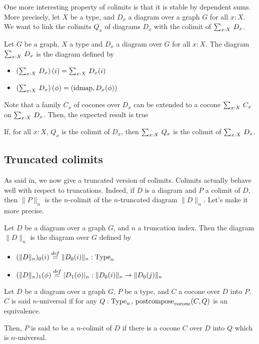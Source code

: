 One more interesting property of colimits is that it is stable by
dependent sums. More precisely, let $X$ be a type, and $D_x$ a diagram
over a graph $G$ for all $x:X$. We want to link the colimits $Q_x$ of
diagrams $D_x$ with the colimit of $\sum_{x:X}\, D_x$.
\begin{defi}
  Let $G$ be a graph, $X$ a type and $D_x$ a diagram over $G$ for all
  $x:X$. The diagram $\sum_{x:X}\, D_x$ is the diagram defined by
  \begin{itemize}
  \item $\left( \sum_{x:X}\, D_x \right)(i) = \sum_{x:X}\, D_x(i)$
  \item $\left( \sum_{x:X}\, D_x \right)(\phi) = (\operatorname{\mathrm{idmap}}, D_x(\phi))$
  \end{itemize}
\end{defi}

Note that a family $C_x$ of cocones over $D_x$ can be extended to a
cocone $\sum_{x:X}\, C_x$ on $\sum_{x:X}\, D_x$. Then, the expected
result is true
\begin{prop}
  If, for all $x:X$, $Q_x$ is the colimit of $D_x$, then $\sum_{x:X}\, Q_x$ is the colimit of $\sum_{x:X}\, D_x$.
\end{prop}




\subsection{Truncated colimits}
\label{ssec:trunc_colim}

As said in, we now give a
truncated version of colimits. 
Colimits actually behave well with respect to truncations. Indeed, if $D$ is a
diagram and $P$ a colimit of $D$, then $\|P\|_n$ is the $n$-colimit
of the $n$-truncated diagram $\|D\|_n$. Let's make it more precise.

\begin{defi}
  Let $D$ be a diagram over a graph $G$, and $n$ a truncation index.
  Then the diagram $\|D\|_n$ is the diagram over $G$ defined by
  \begin{itemize}
  \item $(\|D\|_n)_0(i) \overset{de\hspace{-0.2ex}f}{=} \|D_0(i)\|_n:\operatorname{Type}_n$
  \item $(\|D\|_n)_1(\phi) \overset{de\hspace{-0.2ex}f}{=} |D_1(\phi)|_n : \|D_0(i)\|_n \to \|D_0(j)\|_n$
  \end{itemize}
\end{defi}

\begin{defi}
  Let $D$ be a diagram over a graph $G$, $P$ be a type, and $C$ a
  cocone over $D$ into $P$. $C$ is said $n$-universal if for any
  $Q:\operatorname{Type}_n$, $\operatorname{\mathrm{postcompose}}_{\mathrm{cocone}}(C,Q)$ is an
  equivalence.

  Then, $P$ is said to be a $n$-colimit of $D$ if there is a cocone
  $C$ over $D$ into $Q$ which is $n$-universal.
\end{defi}

